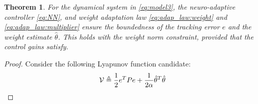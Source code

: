 \documentclass[conference]{IEEEtran}
\newtheorem{theorem}{Theorem}
\begin{document}
\begin{theorem}
    For the dynamical system in \eqref{eq:model3}, the neuro-adaptive controller \eqref{eq:NN}, and weight adaptation law \eqref{eq:adap_law:weight} and \eqref{eq:adap_law:multiplier} ensure the boundedness of the tracking error $e$ and the weight estimate $\hat \theta$. 
	This holds with the weight norm constraint, provided that the control gains satisfy.
\end{theorem}

\begin{proof}

Consider the following Lyapunov function candidate:
\begin{equation}
	\mathcal V \triangleq {1\over 2} e^TPe + {1\over 2\alpha} \hat\theta^T\hat\theta
\end{equation}


\end{proof}
\end{document}
